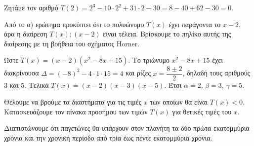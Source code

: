 \begin{alist}
\item Ζητάμε τον αριθμό $T(2) = 2^3 - 10 \cdot 2^2 + 31 \cdot 2 - 30 = 8 - 40 + 62 - 30 = 0$.
\item Από το α) ερώτημα προκύπτει ότι το πολυώνυμο $T(x)$ έχει παράγοντα το $x - 2$, άρα η διαίρεση $T(x) : (x - 2)$ είναι τέλεια. Βρίσκουμε το πηλίκο αυτής της διαίρεσης με τη βοήθεια του σχήματος Horner.
\begin{center}
\end{center}
Ώστε $T(x) = (x - 2)(x^2 - 8x + 15)$.
Το τριώνυμο $x^2 - 8x + 15$ έχει διακρίνουσα $\varDelta = (-8)^2 - 4 \cdot 1 \cdot 15 = 4$ και ρίζες $x = \dfrac{8 \pm 2}{2}$, δηλαδή τους αριθμούς 3 και 5. Τελικά $T(x) = (x - 2)(x - 3)(x - 5)$.
Έτσι $\alpha = 2$, $\beta = 3$, $\gamma = 5$.
\item Θέλουμε να βρούμε τα διαστήματα για τις τιμές $x$ των οποίων θα είναι $T(x) < 0$. Κατασκευάζουμε τον πίνακα προσήμου των τιμών $T(x)$ για θετικές τιμές του $x$.
\begin{center}
\end{center}
Διαπιστώνουμε ότι παγετώνες θα υπάρχουν στον πλανήτη τα δύο πρώτα εκατομμύρια χρόνια και την χρονική περίοδο από τρία έως πέντε εκατομμύρια χρόνια.
\end{alist}

